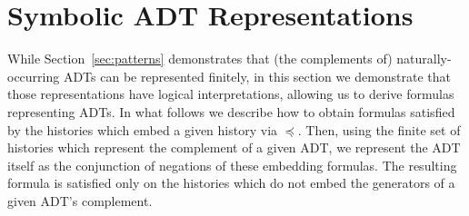 \section{Symbolic ADT Representations}
\label{sec:formula}

While Section~\ref{sec:patterns} demonstrates that (the complements of)
naturally-occurring ADTs can be represented finitely, in this section we
demonstrate that those representations have logical interpretations,
allowing us to derive formulas representing ADTs. In what follows we
describe how to obtain formulas satisfied by the histories which
embed a given history via $\preceq$. Then, using the finite set of histories
which represent the complement of a given ADT, we represent the ADT itself as
the conjunction of negations of these embedding formulas. The resulting formula
is satisfied only on the histories which do not embed the generators of a given
ADT’s complement.


